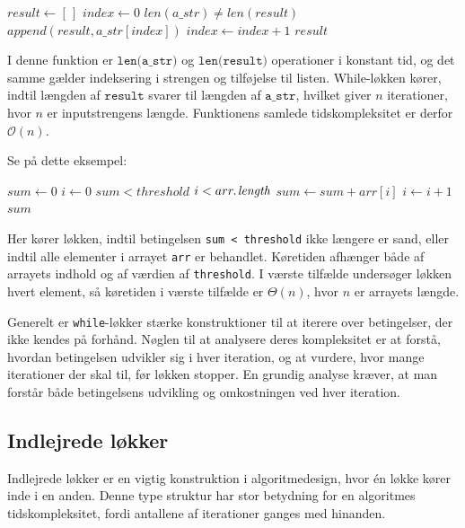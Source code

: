 \begin{codebox}
    \li $result \gets [\,]$ 
    \li $index \gets 0$
    \li \While $len(a\_str) \neq len(result)$ \Do
    \li     $append(result, a\_str[index])$
    \li     $index \gets index + 1$
        \End
    \li \Return $result$
\end{codebox}

I denne funktion er $\texttt{len(a\_str)}$ og $\texttt{len(result)}$ operationer i konstant tid, og det samme gælder indeksering i strengen og tilføjelse til listen. While-løkken kører, indtil længden af $\texttt{result}$ svarer til længden af $\texttt{a\_str}$, hvilket giver $n$ iterationer, hvor $n$ er inputstrengens længde. Funktionens samlede tidskompleksitet er derfor $\mathcal{O}(n)$.

Se på dette eksempel:

\begin{codebox}
    \li $sum \gets 0$
    \li $i \gets 0$
    \li \While $sum < threshold$  $i < \attrib{arr}{length}$ \Do
    \li     $sum \gets sum + arr[i]$
    \li     $i \gets i + 1$
        \End
    \li \Return $sum$
\end{codebox}

Her kører løkken, indtil betingelsen \texttt{sum < threshold} ikke længere er sand, eller indtil alle elementer i arrayet \texttt{arr} er behandlet. Køretiden afhænger både af arrayets indhold og af værdien af \texttt{threshold}. I værste tilfælde undersøger løkken hvert element, så køretiden i værste tilfælde er $\Theta(n)$, hvor $n$ er arrayets længde.

Generelt er \texttt{while}-løkker stærke konstruktioner til at iterere over betingelser, der ikke kendes på forhånd. Nøglen til at analysere deres kompleksitet er at forstå, hvordan betingelsen udvikler sig i hver iteration, og at vurdere, hvor mange iterationer der skal til, før løkken stopper. En grundig analyse kræver, at man forstår både betingelsens udvikling og omkostningen ved hver iteration.

\subsection*{Indlejrede løkker}

Indlejrede løkker er en vigtig konstruktion i algoritmedesign, hvor én løkke kører inde i en anden. Denne type struktur har stor betydning for en algoritmes tidskompleksitet, fordi antallene af iterationer ganges med hinanden.




